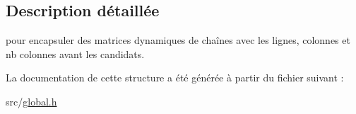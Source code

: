 \subsection{Description détaillée}
pour encapsuler des matrices dynamiques de chaînes avec les lignes, colonnes et nb colonnes avant les candidats. 

La documentation de cette structure a été générée à partir du fichier suivant \+:\begin{DoxyCompactItemize}
\item 
src/\mbox{\hyperlink{global_8h}{global.\+h}}\end{DoxyCompactItemize}

